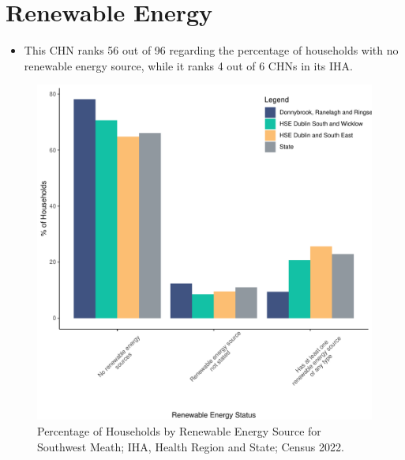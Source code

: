 \documentclass{article}
\begin{document}
\section{Renewable Energy}\label{sect:RE}
\begin{itemize}
\item This CHN ranks  56 out of 96 regarding the percentage of households with no renewable energy source, while it ranks   4 out of 6 CHNs in its IHA.
\end{itemize}
\begin{figure}[H]
	\centering
	\includegraphics[width = 140mm]{../figures/RenewableEnergyED.pdf}
	\caption{Percentage of Households by Renewable Energy Source for Southwest Meath; IHA, Health Region and State; Census 2022.}
	\label{fig:vbnv}
	\end{figure}
\end{document}
